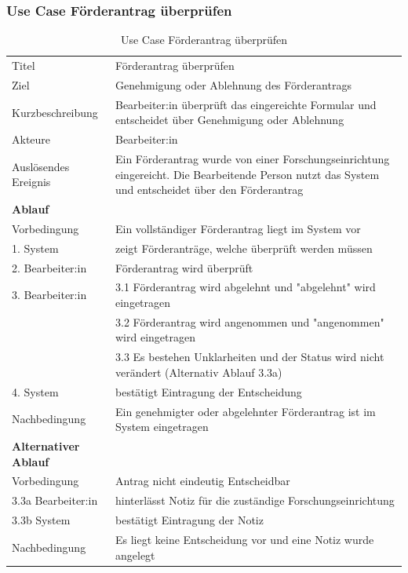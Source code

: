 \documentclass{article}
\begin{document}
\newpage

\subsubsection{Use Case Förderantrag überprüfen}
\begin{table}[htbp]
\centering
\begin{tabularx}{\textwidth}{lX}
\midrule
Titel & Förderantrag überprüfen\\
Ziel & Genehmigung oder Ablehnung des Förderantrags\\
Kurzbeschreibung & Bearbeiter:in überprüft das eingereichte Formular und entscheidet über Genehmigung oder Ablehnung\\
Akteure & Bearbeiter:in\\
Auslösendes Ereignis & Ein Förderantrag wurde von einer Forschungseinrichtung eingereicht. Die Bearbeitende Person nutzt das System und entscheidet über den Förderantrag \\
\textbf{Ablauf} \\
Vorbedingung & Ein vollständiger Förderantrag liegt im System vor\\
\hspace{0.5cm} 1. System & zeigt Förderanträge, welche überprüft werden müssen \\
\hspace{0.5cm} 2. Bearbeiter:in & Förderantrag wird überprüft\\
\hspace{0.5cm} 3. Bearbeiter:in & 3.1 Förderantrag wird abgelehnt und "abgelehnt" wird eingetragen\\
& 3.2 Förderantrag wird angenommen und "angenommen" wird eingetragen\\
& 3.3 Es bestehen Unklarheiten und der Status wird nicht verändert (Alternativ Ablauf 3.3a)\\
\hspace{0.5cm} 4. System & bestätigt Eintragung der Entscheidung\\
Nachbedingung & Ein genehmigter oder abgelehnter Förderantrag ist im System eingetragen\\
\textbf{Alternativer Ablauf} \\
Vorbedingung & Antrag nicht eindeutig Entscheidbar\\
\hspace{0.5cm} 3.3a Bearbeiter:in & hinterlässt Notiz für die zuständige Forschungseinrichtung \\
\hspace{0.5cm} 3.3b System & bestätigt Eintragung der Notiz \\
Nachbedingung & Es liegt keine Entscheidung vor und eine Notiz wurde angelegt\\
\bottomrule
\end{tabularx}
\caption{Use Case Förderantrag überprüfen}
\end{table}
\end{document}
